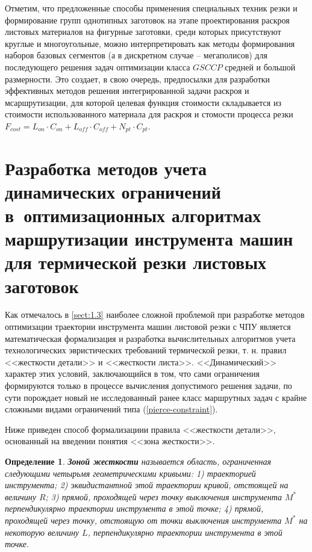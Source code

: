 \documentclass[11pt,twoside,openany]{report}
\newcounter{theo}
\newcounter{pred}
\newcounter{opred}
\newtheorem{opred}{Определение}[section]
\begin{document}
Отметим, что
предложенные способы применения специальных техник резки и
формирование групп однотипных заготовок на этапе
проектирования раскроя листовых материалов на фигурные заготовки,
среди которых присутствуют круглые и многоугольные,
можно интерпретировать как методы формирования наборов базовых сегментов
(а в дискретном случае – мегаполисов)
для последующего решения задач оптимизации класса
$GSCCP$
средней и большой размерности.
Это создает,
в свою очередь,
предпосылки  для разработки эффективных методов
решения интегрированной задачи раскроя и мсаршрутизации,
для которой целевая функция стоимости складывается
из стоимости использованного материала для раскроя
и стомости процесса резки
$
F_{cost}=
L_{on} \cdot C_{on} +
L_{off} \cdot C_{off} +
N_{pt} \cdot C_{pt}
$.

{\raggedright\section{
  Разработка методов учета динамических ограничений
  в~оптимизационных алгоритмах
  маршрутизации инструмента машин
  для термической резки листовых заготовок
}}
\label{sect:2.3}
\setcounter{equation}{0}

Как отмечалось в \ref{sect:1.3}
наиболее сложной проблемой при разработке методов оптимизации
траектории инструмента машин листовой резки с ЧПУ
является математическая формализация и
разработка вычислительных алгоритмов учета
технологических эвристических требований термической резки,
т. н. правил <<жесткости детали>>
и <<жесткости листа>>.
<<Динамический>> характер этих условий, заключающийся в том,
что сами ограничения формируются только в процессе вычисления
допустимого решения задачи, по сути порождает
новый не исследованный ранее класс маршрутных задач
с крайне сложными видами ограничений типа
(\ref{pierce-constraint}).

Ниже приведен способ формализациии правила <<жесткости детали>>,
основанный на введении понятия <<зона жесткости>>.

\begin{opred}
  {\bf Зоной жесткости}
  называется область,
  ограниченная следующими четырьмя геометрическими кривыми:
  1) траекторией инструмента;
  2) эквидистантной этой траектории кривой, отстоящей на величину $R$;
  3) прямой, проходящей через точку выключения инструмента $M^*$
  перпендикулярно траектории инструмента в этой точке;
  4) прямой, проходящей через точку,
  отстоящую от точки выключения инструмента $M^*$ на некоторую величину $L$,
  перпендикулярно траектории инструмента в этой точке.
\end{opred}
\end{document}
